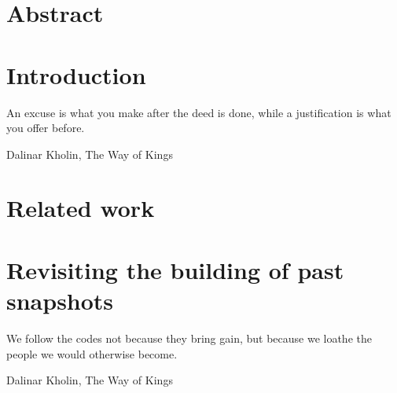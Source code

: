 \documentclass[11pt,a4paper,twoside]{book}
\begin{document}
\frontmatter





\chapter{Abstract}




\mainmatter
\restoreHeader

\chapter{Introduction}
\begin{FraseCelebre}
    \begin{Frase}
        An excuse is what you make after the deed is done, while a justification is what you offer before.
    \end{Frase}
    \begin{Fuente}
        Dalinar Kholin, The Way of Kings
    \end{Fuente}
\end{FraseCelebre}
\label{chapter:intro} 
 

\chapter{Related work}
\label{chapter:related-work}


\chapter{Revisiting the building of past snapshots}
\begin{FraseCelebre}
    \begin{Frase}
        We follow the codes not because they bring gain, but because we loathe the people we would otherwise become.
    \end{Frase}
    \begin{Fuente}
        Dalinar Kholin, The Way of Kings
    \end{Fuente}
\end{FraseCelebre}
\label{chapter:buildability}

\end{document}
